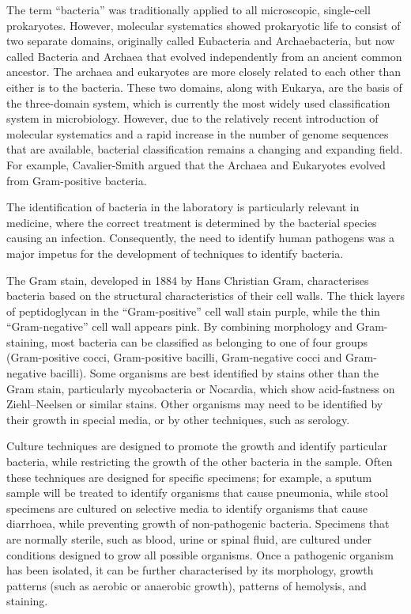 The term ``bacteria'' was traditionally applied to all microscopic, single-cell prokaryotes. However, molecular systematics showed prokaryotic life to consist of two separate domains, originally called Eubacteria and Archaebacteria, but now called Bacteria and Archaea that evolved independently from an ancient common ancestor. The archaea and eukaryotes are more closely related to each other than either is to the bacteria. These two domains, along with Eukarya, are the basis of the three-domain system, which is currently the most widely used classification system in microbiology. However, due to the relatively recent introduction of molecular systematics and a rapid increase in the number of genome sequences that are available, bacterial classification remains a changing and expanding field. For example, Cavalier-Smith argued that the Archaea and Eukaryotes evolved from Gram-positive bacteria.

The identification of bacteria in the laboratory is particularly relevant in medicine, where the correct treatment is determined by the bacterial species causing an infection. Consequently, the need to identify human pathogens was a major impetus for the development of techniques to identify bacteria.

The Gram stain, developed in 1884 by Hans Christian Gram, characterises bacteria based on the structural characteristics of their cell walls. The thick layers of peptidoglycan in the ``Gram-positive'' cell wall stain purple, while the thin ``Gram-negative'' cell wall appears pink. By combining morphology and Gram-staining, most bacteria can be classified as belonging to one of four groups (Gram-positive cocci, Gram-positive bacilli, Gram-negative cocci and Gram-negative bacilli). Some organisms are best identified by stains other than the Gram stain, particularly mycobacteria or Nocardia, which show acid-fastness on Ziehl--Neelsen or similar stains. Other organisms may need to be identified by their growth in special media, or by other techniques, such as serology.

Culture techniques are designed to promote the growth and identify particular bacteria, while restricting the growth of the other bacteria in the sample. Often these techniques are designed for specific specimens; for example, a sputum sample will be treated to identify organisms that cause pneumonia, while stool specimens are cultured on selective media to identify organisms that cause diarrhoea, while preventing growth of non-pathogenic bacteria. Specimens that are normally sterile, such as blood, urine or spinal fluid, are cultured under conditions designed to grow all possible organisms. Once a pathogenic organism has been isolated, it can be further characterised by its morphology, growth patterns (such as aerobic or anaerobic growth), patterns of hemolysis, and staining.

